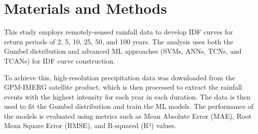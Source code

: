\section{Materials and Methods}
This study employs remotely-sensed rainfall data to develop IDF curves for return periods of 2, 5, 10, 25, 50, and 100 years. The analysis uses both the Gumbel distribution and advanced ML approaches (SVMs, ANNs, TCNs, and TCANs) for IDF curve construction.

\vspace{1em}

To achieve this, high-resolution precipitation data was downloaded from the GPM-IMERG satellite product, which is then processed to extract the rainfall events with the highest intensity for each year in each duration. The data is then used to fit the Gumbel distribution and train the ML models. The performance of the models is evaluated using metrics such as Mean Absolute Error (MAE), Root Mean Square Error (RMSE), and R-squared (R²) values.





